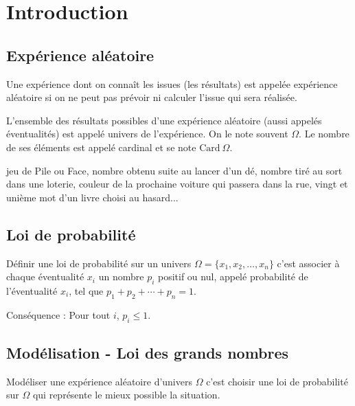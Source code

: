 \documentclass[french]{book}
\newcommand{\ie}{\leq}
\begin{document}
\section{Introduction}
\subsection{Exp\'erience al\'eatoire}
\begin{defn}
Une exp\'erience dont on connaît les issues (les r\'esultats) est appel\'ee exp\'erience al\'eatoire si on ne peut pas pr\'evoir ni calculer l'issue qui sera r\'ealis\'ee.

L'ensemble des r\'esultats possibles d'une exp\'erience al\'eatoire (aussi appel\'es \'eventualit\'es) est appel\'e univers de l'exp\'erience. On le note souvent $\Omega$. Le nombre de ses \'el\'ements est appel\'e cardinal et se note $\text{Card}\ \Omega$.
\end{defn}

\begin{exemple}
jeu de Pile ou Face, nombre obtenu suite au lancer d'un d\'e, nombre tir\'e au sort dans une loterie, couleur de la prochaine voiture qui passera dans la rue, vingt et uni\`eme mot d'un livre choisi au hasard...
\end{exemple}

\subsection{Loi de probabilit\'e}
\begin{defn}
D\'efinir une loi de probabilit\'e sur un univers $\Omega=\{x_1,x_2,\ldots,x_n\}$ c'est associer à chaque \'eventualit\'e $x_i$ un nombre $p_i$ positif ou nul, appel\'e probabilit\'e de l'\'eventualit\'e $x_i$, tel que $p_1 + p_2 + \cdots + p_n=1$.
\end{defn}

Cons\'equence : Pour tout $i$, $p_i\ie 1$.

\subsection{Mod\'elisation - Loi des grands nombres}
\begin{defn}
Mod\'eliser une exp\'erience al\'eatoire d'univers $\Omega$ c'est choisir une loi de probabilit\'e sur $\Omega$ qui repr\'esente le \og mieux possible \fg{} la situation.
\end{defn}
\end{document}
